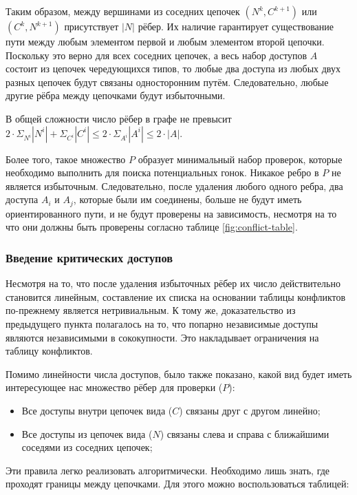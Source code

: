 Таким образом, между вершинами из соседних цепочек $(N^k, C^{k+1})$ или $(C^k, N^{k+1})$ присутствует $|N|$ рёбер. Их наличие гарантирует существование пути между любым элементом первой и любым элементом второй цепочки. Поскольку это верно для всех соседних цепочек, а весь набор доступов $A$ состоит из цепочек чередующихся типов, то любые два доступа из любых двух разных цепочек будут связаны односторонним путём. Следовательно, любые другие рёбра между цепочками будут избыточными.

В общей сложности число рёбер в графе не превысит $2 \cdot \Sigma_{N^i} |N^i| + \Sigma_{C^i} |C^i| \leq 2 \cdot \Sigma_{A^i} |A^i| \leq 2 \cdot |A|$.

Более того, такое множество $P$ образует минимальный набор проверок, которые необходимо выполнить для поиска потенциальных гонок. Никакое ребро в $P$ не является избыточным. Следовательно, после удаления любого одного ребра, два доступа $A_i$ и $A_j$, которые были им соединены, больше не будут иметь ориентированного пути, и не будут проверены на зависимость, несмотря на то что они должны быть проверены согласно таблице \ref{fig:conflict-table}.

\subsubsection{Введение критических доступов}

Несмотря на то, что после удаления избыточных рёбер их число действительно становится линейным, составление их списка на основании таблицы конфликтов по-прежнему является нетривиальным. К тому же, доказательство из предыдущего пункта полагалось на то, что попарно независимые доступы являются независимыми в сококупности. Это накладывает ограничения на таблицу конфликтов.

Помимо линейности числа доступов, было также показано, какой вид будет иметь интересующее нас множество рёбер для проверки ($P$):

\begin{itemize}
    \item Все доступы внутри цепочек вида ($C$) связаны друг с другом линейно;
    \item Все доступы из цепочек вида ($N$) связаны слева и справа с ближайшими соседями из соседних цепочек;
\end{itemize}

Эти правила легко реализовать алгоритмически. Необходимо лишь знать, где проходят границы между цепочками. Для этого можно воспользоваться таблицей:

